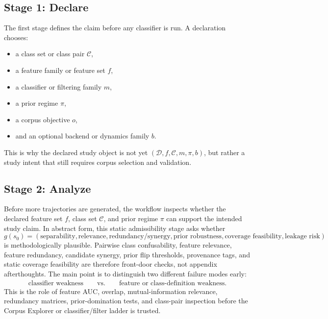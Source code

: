 \documentclass[11pt]{article}
\begin{document}
\subsection{Stage 1: Declare}
The first stage defines the claim before any classifier is run. A declaration
chooses:
\begin{itemize}[leftmargin=1.5em]
  \item a class set or class pair \(\mathcal{C}\),
  \item a feature family or feature set \(f\),
  \item a classifier or filtering family \(m\),
  \item a prior regime \(\pi\),
  \item a corpus objective \(o\),
  \item and an optional backend or dynamics family \(b\).
\end{itemize}
This is why the declared study object is not yet
\((\mathcal{D}, f, \mathcal{C}, m, \pi, b)\), but rather a study intent that
still requires corpus selection and validation.

\subsection{Stage 2: Analyze}
Before more trajectories are generated, the workflow inspects whether the
declared feature set \(f\), class set \(\mathcal{C}\), and prior regime
\(\pi\) can support the intended study claim. In abstract form, this static
admissibility stage asks whether
\begin{equation}
g(s_0) =
\left(
\text{separability},
\text{relevance},
\text{redundancy/synergy},
\text{prior robustness},
\text{coverage feasibility},
\text{leakage risk}
\right)
\end{equation}
is methodologically plausible. Pairwise class confusability, feature relevance,
feature redundancy, candidate synergy, prior flip thresholds, provenance tags,
and static coverage feasibility are therefore front-door checks, not appendix
afterthoughts. The main point is to distinguish two different failure modes
early:
\begin{align}
\text{classifier weakness}
\qquad\text{vs.}\qquad
\text{feature or class-definition weakness}.
\end{align}
This is the role of feature AUC, overlap, mutual-information relevance,
redundancy matrices, prior-domination tests, and class-pair inspection before
the Corpus Explorer or classifier/filter ladder is trusted.
\end{document}
